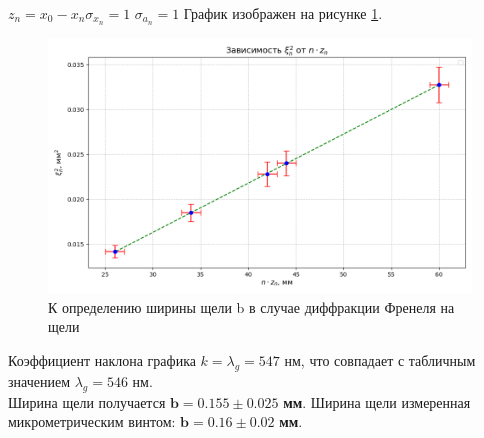  $z_n = x_0 - x_n$$\sigma_{x_n} = 1$ $\sigma_{a_n} = 1 $ График изображен на рисунке \ref{fig:plot_A}.
\begin{figure}[!ht]
    \centering
    \includegraphics[width=18cm]{images/plot_A.png}
    \caption{К определению ширины щели b в случае диффракции Френеля на щели} \label{fig:plot_A}
\end{figure}
\noindent
Коэффициент наклона графика $k = \lambda_{g} = 547$ нм, что совпадает с табличным значением $\lambda_{g} = 546$ нм.
\\ Ширина щели получается $\mathbf{b = 0.155 \pm 0.025}$ \textbf{мм}. Ширина щели измеренная микрометрическим винтом: $\mathbf{b = 0.16 \pm 0.02}$ \textbf{мм}.

